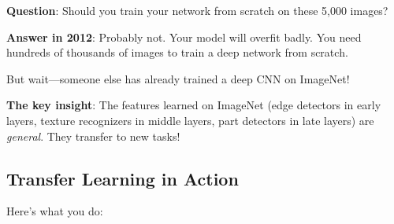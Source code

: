 \documentclass{article}
\begin{document}
\textbf{Question}: Should you train your network from scratch on these 5,000 images?

\textbf{Answer in 2012}: Probably not. Your model will overfit badly. You need hundreds of thousands of images to train a deep network from scratch.

But wait---someone else has already trained a deep CNN on ImageNet!

\begin{center}
\end{center}

\textbf{The key insight}: The features learned on ImageNet (edge detectors in early layers, texture recognizers in middle layers, part detectors in late layers) are \textit{general}. They transfer to new tasks!

\subsection{Transfer Learning in Action}

Here's what you do:
\end{document}
